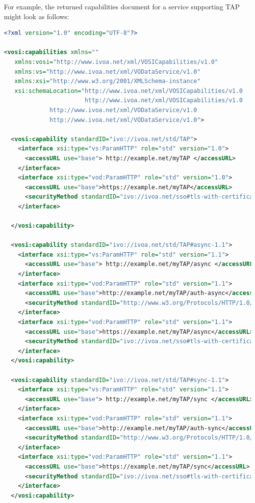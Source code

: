 \documentclass[11pt,letter]{ivoa}
\begin{document}
For example, the returned capabilities document for a service supporting  TAP 
might look as follows:

\begin{lstlisting}[language=XML]
<?xml version="1.0" encoding="UTF-8"?>

<vosi:capabilities xmlns=""
   xmlns:vosi="http://www.ivoa.net/xml/VOSICapabilities/v1.0"
   xmlns:vs="http://www.ivoa.net/xml/VODataService/v1.0"
   xmlns:xsi="http://www.w3.org/2001/XMLSchema-instance"
   xsi:schemaLocation="http://www.ivoa.net/xml/VOSICapabilities/v1.0
                       http://www.ivoa.net/xml/VOSICapabilities/v1.0
             http://www.ivoa.net/xml/VODataService/v1.0
             http://www.ivoa.net/xml/VODataService/v1.0">

  <vosi:capability standardID="ivo://ivoa.net/std/TAP">
    <interface xsi:type="vs:ParamHTTP" role="std" version="1.0">
      <accessURL use="base"> http://example.net/myTAP </accessURL>
    </interface>
    <interface xsi:type="vod:ParamHTTP" role="std" version="1.0">
      <accessURL use="base">https://example.net/myTAP</accessURL>
      <securityMethod standardID="ivo://ivoa.net/sso#tls-with-certificate" />
    </interface>

  </vosi:capability>
  
  <vosi:capability standardID="ivo://ivoa.net/std/TAP#async-1.1">
    <interface xsi:type="vs:ParamHTTP" role="std" version="1.1">
      <accessURL use="base"> http://example.net/myTAP/async </accessURL>
    </interface>
    <interface xsi:type="vod:ParamHTTP" role="std" version="1.1">
      <accessURL use="base">http://example.net/myTAP/auth-async</accessURL>
      <securityMethod standardID="http://www.w3.org/Protocols/HTTP/1.0/spec.html#BasicAA" />
    </interface>
    <interface xsi:type="vod:ParamHTTP" role="std" version="1.1">
      <accessURL use="base">https://example.net/myTAP/async</accessURL>
      <securityMethod standardID="ivo://ivoa.net/sso#tls-with-certificate" />
    </interface>
  </vosi:capability>

  <vosi:capability standardID="ivo://ivoa.net/std/TAP#sync-1.1">
    <interface xsi:type="vs:ParamHTTP" role="std" version="1.1">
      <accessURL use="base"> http://example.net/myTAP/sync </accessURL>
    </interface>
    <interface xsi:type="vod:ParamHTTP" role="std" version="1.1">
      <accessURL use="base">http://example.net/myTAP/auth-sync</accessURL>
      <securityMethod standardID="http://www.w3.org/Protocols/HTTP/1.0/spec.html#BasicAA" />
    </interface>
    <interface xsi:type="vod:ParamHTTP" role="std" version="1.1">
      <accessURL use="base">https://example.net/myTAP/sync</accessURL>
      <securityMethod standardID="ivo://ivoa.net/sso#tls-with-certificate" />
    </interface>
  </vosi:capability>


\end{lstlisting}
\end{document}
